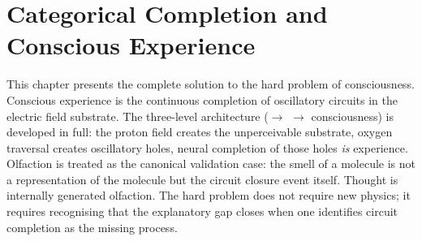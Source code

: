 \chapter{Categorical Completion and Conscious Experience}
\label{ch:categorical_completion}


\begin{chapterabstract}
This chapter presents the complete solution to the hard problem of consciousness. Conscious experience is the continuous completion of oscillatory circuits in the \Hplus electric field substrate. The three-level architecture (\Hplus $\to$ \Otwo $\to$ consciousness) is developed in full: the proton field creates the unperceivable substrate, oxygen traversal creates oscillatory holes, neural completion of those holes \emph{is} experience. Olfaction is treated as the canonical validation case: the smell of a molecule is not a representation of the molecule but the circuit closure event itself. Thought is internally generated olfaction. The hard problem does not require new physics; it requires recognising that the explanatory gap closes when one identifies circuit completion as the missing process.
\end{chapterabstract}


